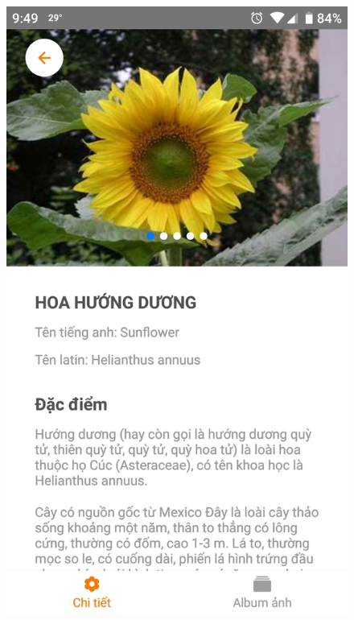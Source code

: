 \documentclass[12pt]{report}
\begin{document}
		\begin{figure}[h]
			\centering
			\includegraphics[scale=0.18]{app_detail1}

\end{figure}
\end{document}
